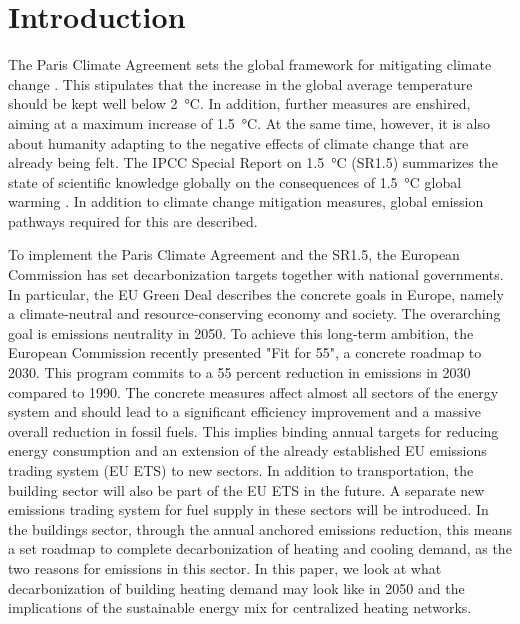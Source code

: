 \section{Introduction}
The Paris Climate Agreement sets the global framework for mitigating climate change \cite{agreement2015paris}. This stipulates that the increase in the global average temperature should be kept well below \SI{2}{\degreeCelsius}. In addition, further measures are enshired, aiming at a maximum increase of \SI{1.5}{\degreeCelsius}. At the same time, however, it is also about humanity adapting to the negative effects of climate change that are already being felt. The IPCC Special Report on \SI{1.5}{\degreeCelsius} (SR1.5) summarizes the state of scientific knowledge globally on the consequences of \SI{1.5}{\degreeCelsius} global warming \cite{edenhofer2011ipcc}. In addition to climate change mitigation measures, global emission pathways required for this are described.\newline

To implement the Paris Climate Agreement and the SR1.5, the European Commission has set decarbonization targets together with national governments. In particular, the EU Green Deal describes the concrete goals in Europe, namely a climate-neutral and resource-conserving economy and society. The overarching goal is emissions neutrality in 2050. To achieve this long-term ambition, the European Commission recently presented "Fit for 55", a concrete roadmap to 2030. This program commits to a 55 percent reduction in emissions in 2030 compared to 1990. The concrete measures affect almost all sectors of the energy system and should lead to a significant efficiency improvement and a massive overall reduction in fossil fuels. This implies binding annual targets for reducing energy consumption and an extension of the already established EU emissions trading system (EU ETS) to new sectors. In addition to transportation, the building sector will also be part of the EU ETS in the future. A separate new emissions trading system for fuel supply in these sectors will be introduced. In the buildings sector, through the annual anchored emissions reduction, this means a set roadmap to complete decarbonization of heating and cooling demand, as the two reasons for emissions in this sector. In this paper, we look at what decarbonization of building heating demand may look like in 2050 and the implications of the sustainable energy mix for centralized heating networks.\newline

